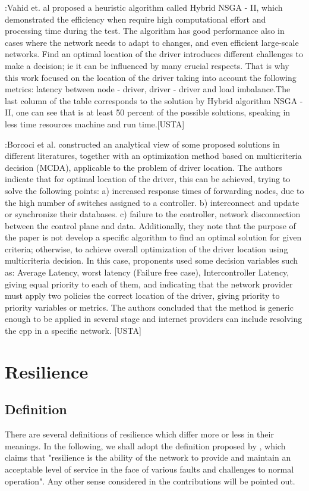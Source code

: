 \documentclass[a4paper,10pt]{article}
\begin{document}
\cite{AhJa15}:Vahid et. al proposed a heuristic algorithm called Hybrid NSGA - II, which demonstrated the efficiency when require high computational effort and processing time during the test. The algorithm has good performance also in cases where the network needs to adapt to changes, and even efficient large-scale networks. Find an optimal location of the driver introduces different challenges to make a decision; ie it can be influenced by many crucial respects. That is why this work focused on the location of the driver taking into account the following metrics: latency between node - driver, driver - driver and load imbalance.The last column of the table corresponds to the solution by Hybrid algorithm NSGA - II, one can see that is at least 50 percent of the possible solutions, speaking in less time resources machine and run time.[USTA]

\cite{VoBo15}:Borcoci et al. constructed an analytical view of some proposed solutions in different literatures, together with an optimization method based on multicriteria decision (MCDA), applicable to the problem of driver location. The authors indicate that for optimal location of the driver, this can be achieved, trying to solve the following points: a) increased response times of forwarding nodes, due to the high number of switches assigned to a controller. b) interconnect and update or synchronize their databases. c) failure to the controller, network disconnection between the control plane and data. Additionally, they note that the purpose of the paper is not develop a specific algorithm to find an optimal solution for given criteria; otherwise, to achieve overall optimization of the driver location using multicriteria decision. In this case, proponents used some decision variables such as: Average Latency, worst latency (Failure free case), Intercontroller Latency, giving equal priority to each of them, and indicating that the network provider must apply two policies the correct location of the driver, giving priority to priority variables or metrics. The authors concluded that the method is generic enough to be applied in several stage and internet providers can include resolving the cpp in a specific network. [USTA]

\section{Resilience}
\subsection{Definition}
There are several definitions of resilience which differ more or less in their meanings. In the following, we shall adopt the definition proposed by \cite{StHu07}, which claims that   "resilience is the ability of the network to provide and maintain an acceptable level of service in the face of various faults and challenges to normal operation".  Any other sense considered in the contributions will be pointed out.
\end{document}
